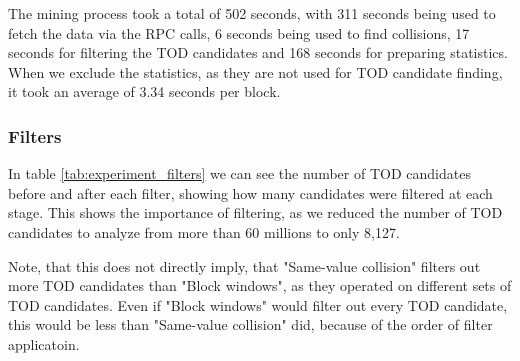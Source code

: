 \documentclass[draft,final]{vutinfth} %
\begin{document}
The mining process took a total of 502 seconds, with 311 seconds being used to fetch the data via the RPC calls, 6 seconds being used to find collisions, 17 seconds for filtering the TOD candidates and 168 seconds for preparing statistics. When we exclude the statistics, as they are not used for TOD candidate finding, it took an average of 3.34 seconds per block.

\subsubsection{Filters}

In table \ref{tab:experiment_filters} we can see the number of TOD candidates before and after each filter, showing how many candidates were filtered at each stage. This shows the importance of filtering, as we reduced the number of TOD candidates to analyze from more than 60 millions to only 8,127.

Note, that this does not directly imply, that "Same-value collision" filters out more TOD candidates than "Block windows", as they operated on different sets of TOD candidates. Even if "Block windows" would filter out every TOD candidate, this would be less than "Same-value collision" did, because of the order of filter applicatoin.
\end{document}
